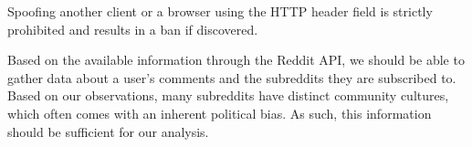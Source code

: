 Spoofing another client or a browser using the  \ac{HTTP} header
field is strictly prohibited and results in a ban if discovered.
\citep{RedditApiRules}\nl

Based on the available information through the Reddit API, we should be able to
gather data about a user's comments and the subreddits they are subscribed to.
Based on our observations, many subreddits have distinct community cultures,
which often comes with an inherent political bias. As such, this information
should be sufficient for our analysis.
